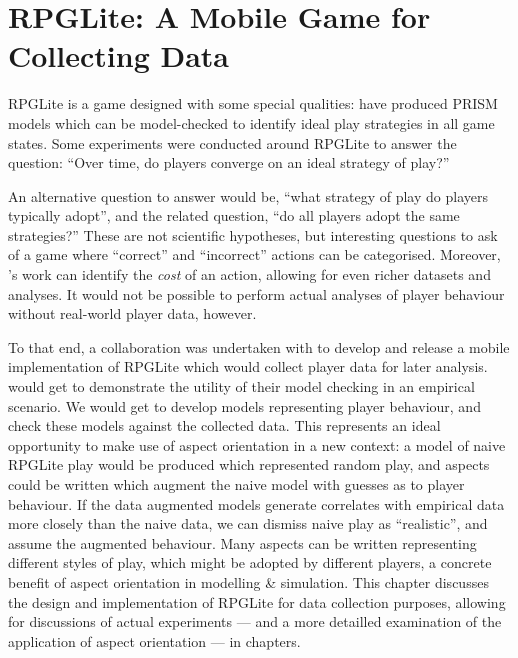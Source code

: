 \chapter{RPGLite: A Mobile Game for Collecting Data}

RPGLite is a game designed with some special qualities:
\citeauthor{kavanagh2020} have produced PRISM models which can be model-checked
to identify ideal play strategies in all game
states\cite{kavanagh2020}.
Some experiments were conducted around RPGLite to answer the question: ``Over
time, do players converge on an ideal strategy of play?''

An alternative question to answer would be, ``what strategy of play do players
typically adopt'', and the related question, ``do all players adopt the same
strategies?'' These are not scientific hypotheses, but interesting questions to
ask of a game where ``correct'' and ``incorrect'' actions can be categorised.
Moreover, \citeauthor{kavanagh2020}'s work can identify the \emph{cost} of an
action, allowing for even richer datasets and analyses. It would not be possible
to perform actual analyses of player behaviour without real-world player data,
however.

To that end, a collaboration was undertaken with \citeauthor{kavanagh2020} to
develop and release a mobile implementation of RPGLite which would collect
player data for later analysis. \citeauthor{kavanagh2020} would get to
demonstrate the utility of their model checking in an empirical scenario. We
would get to develop models representing player behaviour, and check these
models against the collected data. This represents an ideal opportunity to make
use of aspect orientation in a new context: a model of naive RPGLite play would
be produced which represented random play, and aspects could be written which augment the naive
model with guesses as to player behaviour. If the data augmented models generate
correlates with empirical data more closely than the naive data, we can dismiss
naive play as ``realistic'', and assume the augmented behaviour. Many aspects
can be written representing different styles of play, which might be adopted by
different players, a concrete benefit of aspect orientation in modelling \&
simulation. This chapter discusses the design and implementation of RPGLite for
data collection purposes, allowing for discussions of actual experiments --- and
a more detailled examination of the application of aspect orientation --- in
chapters.

